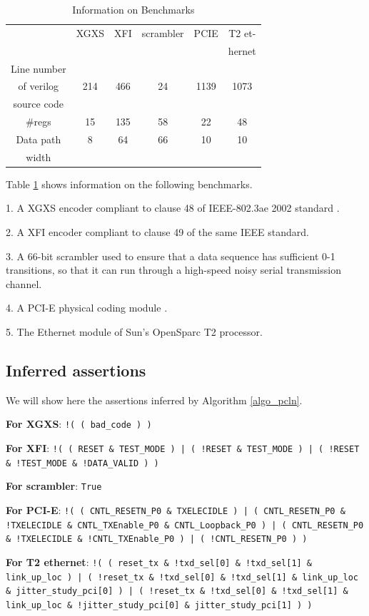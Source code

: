 \documentclass[journal]{IEEEtran}
\begin{document}
\begin{table}[t]
\centering
\caption{Information on Benchmarks}
\begin{tabular}{|c|c|c|c|c|c|}
\hline
&XGXS&XFI&scrambler&PCIE&T2 et-\\
&&&&&hernet\\\hline
Line number&&&&&\\
of verilog&214&466&24&1139&1073\\
source code&&&&&\\\hline
\#regs&15&135&58&22&48\\\hline
Data path&8&64&66&10&10\\
width&&&&&\\ \hline
\end{tabular}\label{tab_benchmark}
\end{table}




Table \ref{tab_benchmark} shows information on the following benchmarks.

1. A XGXS encoder compliant to clause 48 of IEEE-802.3ae 2002 standard \cite{IEEE80232002}.

2. A XFI encoder compliant to clause 49 of the same IEEE standard.

3. A 66-bit scrambler used to ensure
that a data sequence has sufficient 0-1 transitions,
so that it can run through a high-speed
noisy serial transmission channel.

4. A PCI-E physical coding module \cite{PCIESPEC}.

5. The Ethernet module of Sun's OpenSparc T2 processor.

\subsection{Inferred assertions}
We will show here the assertions inferred by Algorithm \ref{algo_pcln}.

\textbf{For XGXS}:
\texttt{!( ( bad\_code ) )}

\textbf{For XFI}:
\texttt{!( ( RESET \& TEST\_MODE ) | ( !RESET \& TEST\_MODE ) | ( !RESET \& !TEST\_MODE \& !DATA\_VALID ) )}

\textbf{For scrambler}:
\texttt{True}

\textbf{For PCI-E}:
\texttt{!( ( CNTL\_RESETN\_P0 \& TXELECIDLE ) | ( CNTL\_RESETN\_P0 \& !TXELECIDLE \& CNTL\_TXEnable\_P0 \& CNTL\_Loopback\_P0 ) | ( CNTL\_RESETN\_P0 \& !TXELECIDLE \& !CNTL\_TXEnable\_P0 ) | ( !CNTL\_RESETN\_P0 ) )}

\textbf{For T2 ethernet}:
\texttt{!( ( reset\_tx \& !txd\_sel[0] \& !txd\_sel[1] \& link\_up\_loc ) | ( !reset\_tx \& !txd\_sel[0] \& !txd\_sel[1] \& link\_up\_loc \& jitter\_study\_pci[0] ) | ( !reset\_tx \& !txd\_sel[0] \& !txd\_sel[1] \& link\_up\_loc \& !jitter\_study\_pci[0] \& jitter\_study\_pci[1] ) )}
\end{document}
